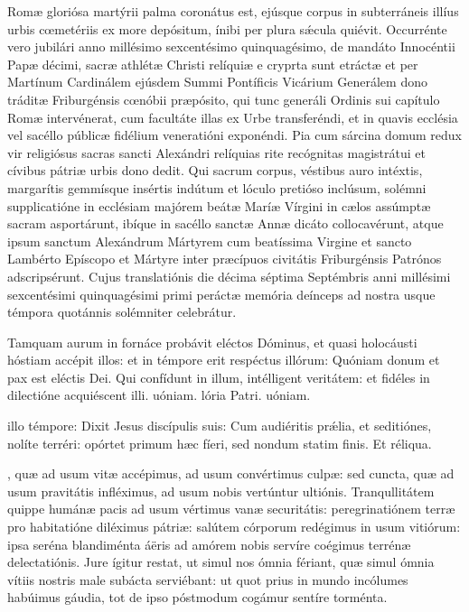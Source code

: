 \documentclass[fontsize=9pt,paper=A6,twoside,BCOR=1mm,DIV=22,headinclude]{scrarticle}
\begin{document}
\begin{multicols}{2}
{
 Romæ gloriósa martýrii palma coronátus est, ejúsque corpus in subterráneis illíus urbis cœmetériis ex more depósitum, ínibi per plura s\'æcula quiévit. Occurrénte vero jubilári anno millésimo sexcentésimo quinquagésimo, de mandáto Innocéntii Papæ décimi, sacræ athlétæ Christi relíquiæ e cryprta sunt etráctæ et per Martínum Cardinálem ejúsdem Summi Pontíficis Vicárium Generálem dono tráditæ Friburgénsis cœnóbii præpósito, qui tunc generáli Ordinis sui capítulo Romæ intervénerat, cum facultáte illas ex Urbe transferéndi, et in quavis ecclésia vel sacéllo públicæ fidélium veneratióni exponéndi. Pia cum sárcina domum redux vir religiósus sacras sancti Alexándri relíquias rite recógnitas magistrátui et cívibus pátriæ urbis dono dedit. Qui sacrum corpus, véstibus auro intéxtis, margarítis gemmísque insértis indútum et lóculo pretióso inclúsum, solémni supplicatióne in ecclésiam majórem beátæ Maríæ Vírgini in cælos assúmptæ sacram asportárunt, ibíque in sacéllo sanctæ Annæ dicáto collocavérunt, atque ipsum sanctum Alexándrum Mártyrem cum beatíssima Virgine et sancto Lambérto Epíscopo et Mártyre inter præcípuos civitátis Friburgénsis Patrónos adscripsérunt. Cujus translatiónis die décima séptima Septémbris anni millésimi sexcentésimi quinquagésimi primi peráctæ memória deínceps ad nostra usque témpora quotánnis solémniter celebrátur.

\R Tamquam aurum in fornáce probávit eléctos Dóminus, et quasi holocáusti hóstiam accépit illos: et in témpore erit respéctus illórum: \red{*} Quóniam donum et pax est eléctis Dei.
\V Qui confídunt in illum, intélligent veritátem: et fidéles in dilectióne acquiéscent illi. uóniam. lória Patri. uóniam.

 illo témpore: Dixit Jesus discípulis suis: Cum audiéritis pr\'ælia, et seditiónes, nolíte terréri: opórtet primum hæc fíeri, sed nondum statim finis. Et réliqua.

, quæ ad usum vitæ accépimus, ad usum convértimus culpæ: sed cuncta, quæ ad usum pravitátis infléximus, ad usum nobis vertúntur ultiónis. Tranqullitátem quippe humánæ pacis ad usum vértimus vanæ securitátis: peregrinatiónem terræ pro habitatióne diléximus pátriæ: salútem córporum redégimus in usum vitiórum: ipsa seréna blandiménta áëris ad amórem nobis servíre coégimus terrénæ delectatiónis. Jure ígitur restat, ut simul nos ómnia fériant, quæ simul ómnia vítiis nostris male subácta serviébant: ut quot prius in mundo incólumes habúimus gáudia, tot de ipso póstmodum cogámur sentíre torménta.

}
\end{multicols}
\end{document}
